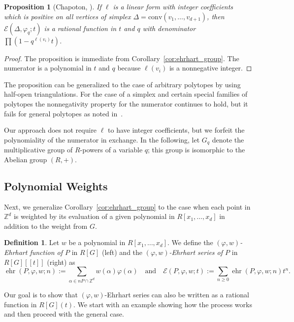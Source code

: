 \documentclass[12pt,reqno]{amsart}
\newtheorem{prop}[thm]{Proposition}
\theoremstyle{definition}
\newtheorem{definition}[thm]{Definition}
\theoremstyle{remark}
\newcommand{\conv}{\mathrm{conv}}
\newcommand{\Z}{\mathbb{Z}}
\renewcommand{\phi}{\varphi}
\DeclareMathOperator{\ehr}{ehr}
\begin{document}
\begin{prop}[Chapoton, \cite{chapoton_2016}]
If $\ell$ is a linear form with integer coefficients which is positive on all vertices of simplex $\Delta=\conv(v_1,\ldots,v_{d+1})$, then
$\mathcal E(\Delta, \phi_q;t)$ is a rational function in $t$ and $q$ with denominator $\prod (1-q^{\ell(v_i)}t)$.
\end{prop}
\begin{proof}
The proposition is immediate from Corollary~\ref{cor:ehrhart_group}. The numerator is a polynomial in $t$ and $q$ because $\ell(v_i)$ is a nonnegative integer.
\end{proof}



The proposition can be generalized to the case of arbitrary polytopes by using half-open triangulations. For the case of a simplex and certain special families of polytopes \cite{deloera2024weighted} the nonnegativity property for the numerator continues to hold, but it fails for general polytopes as noted in~\cite{chapoton_2016}. 


Our approach does not require $\ell$ to have integer coefficients, but we forfeit the polynomiality of the numerator in exchange. In the following, let $G_q$ denote the multiplicative group of $R$-powers of a variable $q$; this group is isomorphic to the Abelian group $(R,+)$.

\subsection{Polynomial Weights}



Next, we generalize Corollary~\ref{cor:ehrhart_group} to the case when each point in $\Z^d$ is weighted by its evaluation of a given polynomial in $R[x_1,\ldots,x_d]$ in addition to the weight from $G$.

\begin{definition}
Let $w$ be a polynomial in $R[x_1,\ldots,x_d]$. We define the {\it $(\phi,w)$-Ehrhart function of $P$} in $R[G]$ (left) and the {\it $(\phi,w)$-Ehrhart series of $P$} in $R[G][[t]]$ (right) as
$$\ehr(P,\phi,w;n):=\sum_{\alpha\in nP\cap \Z^d}w(\alpha)\phi(\alpha) \quad \text{and} \quad \mathcal E(P,\phi,w;t):=\sum_{n\geq 0} \ehr(P,\phi,w;n)t^n.$$
\end{definition}

Our goal is to show that $(\phi,w)$-Ehrhart series can also be written as a rational function in $R[G](t)$. We start with an example showing how the process works and then proceed with the general case.
\end{document}
